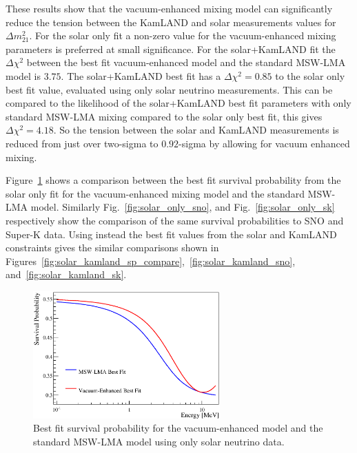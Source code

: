 These results show that the vacuum-enhanced mixing model
can significantly reduce the tension between the KamLAND and solar measurements values
for $\Delta m^{2}_{21}$.
For the solar only fit a non-zero value for the vacuum-enhanced mixing parameters
is preferred at small significance.
For the solar+KamLAND fit the $\Delta \chi^{2}$ between the best fit vacuum-enhanced
model and the standard MSW-LMA model is $3.75$.
The solar+KamLAND best fit has a $\Delta \chi^{2} = 0.85$ to the solar only best fit value,
evaluated using only solar neutrino measurements.
This can be compared to the likelihood of the solar+KamLAND best fit parameters with
only standard MSW-LMA mixing compared to the solar only best fit, this gives $\Delta \chi^{2} = 4.18$.
So the tension between the solar and KamLAND measurements is reduced from just over two-sigma to
$0.92$-sigma by allowing for vacuum enhanced mixing.

Figure~\ref{fig:solar_only_sp_compare} shows a comparison between the best fit
survival probability from the solar only fit for the vacuum-enhanced mixing model and
the standard MSW-LMA model.
Similarly Fig.~\ref{fig:solar_only_sno}, and Fig.~\ref{fig:solar_only_sk} respectively show
the comparison of the same survival probabilities to SNO and Super-K data.
Using instead the best fit values from the solar and KamLAND constraints
gives the similar comparisons shown in Figures~\ref{fig:solar_kamland_sp_compare},~\ref{fig:solar_kamland_sno},
and~\ref{fig:solar_kamland_sk}.

\begin{figure}[htbp]
  \centering
  \includegraphics[width=0.64\textwidth]{sp_compare}
  \caption[Solar Only Best Fit Survival Probability  for MSW-LMA and Vacuum-Enhanced Mixing]{
  Best fit survival probability for the vacuum-enhanced model and the standard MSW-LMA model
  using only solar neutrino data.}
  \label{fig:solar_only_sp_compare}
\end{figure}

